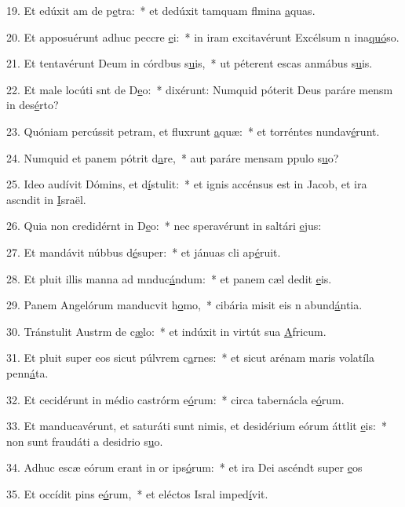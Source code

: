 19. Et edúxit am de p\uline{e}tra:~* et dedúxit tamquam flmina \uline{a}quas.\par 
20. Et apposuérunt adhuc peccre \uline{e}i:~* in iram excitavérunt Excélsum n ina\uline{quó}so.\par 
21. Et tentavérunt Deum in córdbus s\uline{u}is,~* ut péterent escas anmábus s\uline{u}is.\par 
22. Et male locúti snt de D\uline{e}o:~* dixérunt: Numquid póterit Deus paráre mensm in des\uline{é}rto?\par 
23. Quóniam percússit petram, et fluxrunt \uline{a}quæ:~* et torréntes nundav\uline{é}runt.\par 
24. Numquid et panem pótrit d\uline{a}re,~* aut paráre mensam ppulo s\uline{u}o?\par 
25. Ideo audívit Dómins, et d\uline{í}stulit:~* et ignis accénsus est in Jacob, et ira ascndit in \uline{I}sraël.\par 
26. Quia non credidérnt in D\uline{e}o:~* nec speravérunt in saltári \uline{e}jus:\par 
27. Et mandávit núbbus d\uline{é}super:~* et jánuas cli ap\uline{é}ruit.\par 
28. Et pluit illis manna ad mnduc\uline{á}ndum:~* et panem cæl dedit \uline{e}is.\par 
29. Panem Angelórum manducvit h\uline{o}mo,~* cibária misit eis n abund\uline{á}ntia.\par 
30. Tránstulit Austrm de c\uline{æ}lo:~* et indúxit in virtút sua \uline{A}fricum.\par 
31. Et pluit super eos sicut púlvrem c\uline{a}rnes:~* et sicut arénam maris volatíla penn\uline{á}ta.\par 
32. Et cecidérunt in médio castrórm e\uline{ó}rum:~* circa tabernácla e\uline{ó}rum.\par 
33. Et manducavérunt, et saturáti sunt nimis, et desidérium eórum áttlit \uline{e}is:~* non sunt fraudáti a desidrio s\uline{u}o.\par 
34. Adhuc escæ eórum erant in or ips\uline{ó}rum:~* et ira Dei ascéndt super \uline{e}os\par 
35. Et occídit pins e\uline{ó}rum,~* et eléctos Isral imped\uline{í}vit.\par 
